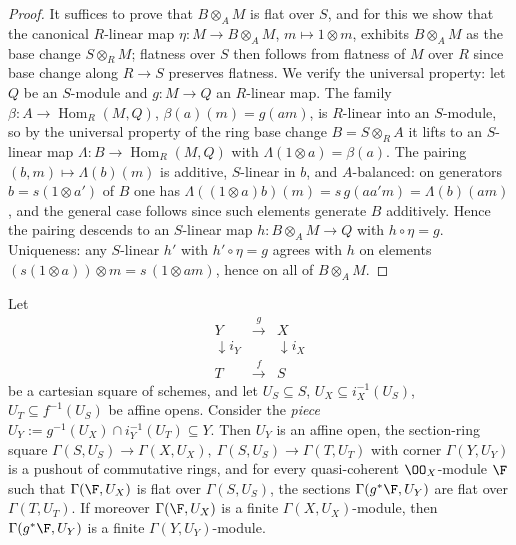 \begin{proof}
  \leanok
  It suffices to prove that \(B \otimes_A M\) is flat over \(S\), and for
  this we show that the canonical \(R\)-linear map
  \(\eta : M \to B \otimes_A M\), \(m \mapsto 1 \otimes m\), exhibits
  \(B \otimes_A M\) as the base change \(S \otimes_R M\); flatness over
  \(S\) then follows from flatness of \(M\) over \(R\) since base change
  along \(R \to S\) preserves flatness.  We verify the universal property:
  let \(Q\) be an \(S\)-module and \(g : M \to Q\) an \(R\)-linear map.  The
  family \(\beta : A \to \operatorname{Hom}_R(M, Q)\),
  \(\beta(a)(m) = g(am)\), is \(R\)-linear into an \(S\)-module, so by the
  universal property of the ring base change \(B = S \otimes_R A\) it lifts
  to an \(S\)-linear map \(\Lambda : B \to \operatorname{Hom}_R(M, Q)\) with
  \(\Lambda(1 \otimes a) = \beta(a)\).  The pairing
  \((b, m) \mapsto \Lambda(b)(m)\) is additive, \(S\)-linear in \(b\), and
  \(A\)-balanced: on generators \(b = s (1 \otimes a')\) of \(B\) one has
  \(\Lambda((1 \otimes a) b)(m) = s\, g(a a' m) = \Lambda(b)(a m)\), and the
  general case follows since such elements generate \(B\) additively.  Hence
  the pairing descends to an \(S\)-linear map
  \(h : B \otimes_A M \to Q\) with \(h \circ \eta = g\).  Uniqueness: any
  \(S\)-linear \(h'\) with \(h' \circ \eta = g\) agrees with \(h\) on
  elements \((s(1 \otimes a)) \otimes m = s\,(1 \otimes am)\), hence on all
  of \(B \otimes_A M\).
\end{proof}

\begin{lemma}

\leanok
  \label{lem:flat_section_pullback_piece}
  Let
  \[
    \begin{array}{ccc}
      Y & \xrightarrow{\;g\;} & X \\
      \downarrow{\scriptstyle i_Y} & & \downarrow{\scriptstyle i_X} \\
      T & \xrightarrow{\;f\;} & S
    \end{array}
  \]
  be a cartesian square of schemes, and let \(U_S \subseteq S\),
  \(U_X \subseteq i_X^{-1}(U_S)\), \(U_T \subseteq f^{-1}(U_S)\) be affine
  opens.  Consider the \emph{piece}
  \(U_Y := g^{-1}(U_X) \cap i_Y^{-1}(U_T) \subseteq Y\).  Then \(U_Y\) is an
  affine open, the section-ring square
  \(\Gamma(S, U_S) \to \Gamma(X, U_X),\ \Gamma(S, U_S) \to \Gamma(T, U_T)\)
  with corner \(\Gamma(Y, U_Y)\) is a pushout of commutative rings, and for
  every quasi-coherent \(\OO_X\)-module \(\F\) such that
  \(\Gamma(\F, U_X)\) is flat over \(\Gamma(S, U_S)\), the sections
  \(\Gamma(g^* \F, U_Y)\) are flat over \(\Gamma(T, U_T)\).  If moreover
  \(\Gamma(\F, U_X)\) is a finite \(\Gamma(X, U_X)\)-module, then
  \(\Gamma(g^* \F, U_Y)\) is a finite \(\Gamma(Y, U_Y)\)-module.
\end{lemma}

